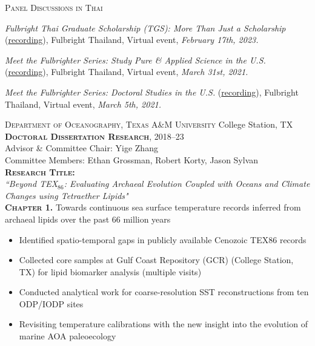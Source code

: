 \documentclass[10pt, letter]{article}
\newcommand{\margintext}[1]{\marginnote{\normalsize\textbf #1 |}}
\begin{document}
\textsc{Panel Discussions in Thai}
\begin{etaremune}
\item \textit{Fulbright Thai Graduate Scholarship (TGS): More Than Just a Scholarship} (\href{https://fb.watch/iLwkVkeNjJ/}{recording}), Fulbright Thailand, Virtual event, \textit{February 17th, 2023.}
\item \textit{Meet the Fulbrighter Series: Study Pure \& Applied Science in the U.S.} (\href{https://www.facebook.com/watch/?v=192470062421053}{recording}), Fulbright Thailand, Virtual event, \textit{March 31st, 2021.}
\item \textit{Meet the Fulbrighter Series: Doctoral Studies in the U.S.} (\href{https://www.facebook.com/watch/?v=1018096972055863}{recording}), Fulbright Thailand, Virtual event,\textit{ March 5th, 2021.} 
\end{etaremune}

\bigskip
\margintext{Previous Research Experience}
\textsc{Department of Oceanography, Texas A\&M University} \hfill College Station, TX \\
\textsc{\textbf{Doctoral Dissertation Research}}, 2018–23 \\
Advisor \& Committee Chair: Yige Zhang \\ 
Committee Members: Ethan Grossman, Robert Korty, Jason Sylvan \\

\textbf{\textsc{Research Title:}} \\
\textit{``Beyond TEX$_{86}$: Evaluating Archaeal Evolution Coupled with Oceans and Climate Changes using Tetraether Lipids"} \\

\textbf{\textsc{Chapter 1.}} Towards continuous sea surface temperature records inferred from archaeal lipids over the past 66 million years
\begin{itemize}[leftmargin=*]
    \item Identified spatio-temporal gaps in publicly available Cenozoic TEX86 records
    \item Collected core samples at Gulf Coast Repository (GCR) (College Station, TX) for lipid biomarker analysis (multiple visits)
    \item Conducted analytical work for coarse-resolution SST reconstructions from ten ODP/IODP sites
    \item Revisiting temperature calibrations with the new insight into the evolution of marine AOA paleoecology
\end{itemize}   
\end{document}
